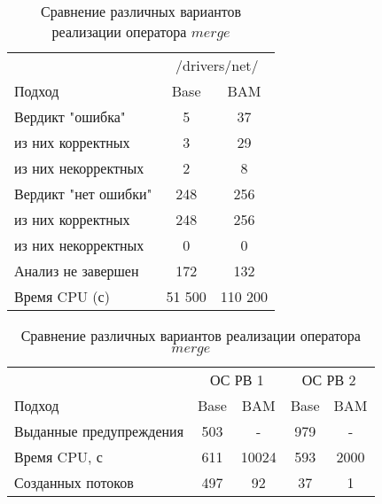 \begin{center}
  \begin{table}[h]\footnotesize \centering
  	\label{table-drivers-lock-refinement}
    \caption{Сравнение различных вариантов реализации оператора $merge$}
    \begin{tabular}{ | l | c | c | }
      \hline
      		& 		 \multicolumn{2}{|c|}{/drivers/net/} \\
      Подход         				& Base  	& BAM 	\\ \hline
      Вердикт "ошибка" 				& 5   		& 37    \\ 
  \hspace{0.5cm} из них корректных 	& 3 		& 29 	\\ 
  \hspace{0.5cm} из них некорректных & 2		& 8 	\\ \hline
      Вердикт "нет ошибки"  		& 248    	& 256    \\ 
  \hspace{0.5cm} из них корректных 	& 248 		& 256    \\
  \hspace{0.5cm} из них некорректных & 0 		& 0    	\\ \hline
      Анализ не завершен       		& 172    	& 132    \\ \hline
      Время CPU (с)   				& 51 500 	& 110 200 \\ 
      \hline
    \end{tabular}
  \end{table}
\end{center}


\begin{center}
  \begin{table}[h]\footnotesize \centering
  	\label{table-drivers-lock-refinement}
    \caption{Сравнение различных вариантов реализации оператора $merge$}
    \begin{tabular}{ | l | c | c | c | c |  }
      \hline
      		& 			 \multicolumn{2}{|c|}{ОС РВ 1} & 	\multicolumn{2}{|c|}{ОС РВ 2}\\
      Подход         					& Base  & BAM  		& Base  & BAM 	\\ \hline
      Выданные предупреждения			& 503   & - 	   	& 979   & -  			\\ 
  	  Время CPU, с 						& 611   & 10024		& 593   & 2000  		\\ 
      Созданных потоков					& 497   & 92    	& 37   	& 1  			\\ \hline
      \hline
    \end{tabular}
  \end{table}
\end{center}


